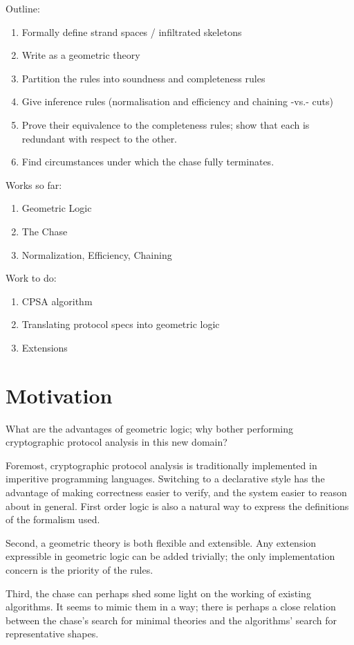\documentclass[12pt]{article}
\begin{document}
Outline:
\begin{enumerate}
\item Formally define strand spaces / infiltrated skeletons
\item Write as a geometric theory
\item Partition the rules into soundness and completeness rules
\item Give inference rules (normalisation and efficiency and chaining
  -vs.- cuts)
\item Prove their equivalence to the completeness rules; show that
  each is redundant with respect to the other.
\item Find circumstances under which the chase fully terminates.
\end{enumerate}

Works so far:
\begin{enumerate}
\item Geometric Logic
\item The Chase
\item Normalization, Efficiency, Chaining
\end{enumerate}

Work to do:
\begin{enumerate}
\item CPSA algorithm
\item Translating protocol specs into geometric logic
\item Extensions
\end{enumerate}

\section{Motivation}

What are the advantages of geometric logic; why bother performing
cryptographic protocol analysis in this new domain?

Foremost, cryptographic protocol analysis is traditionally implemented
in imperitive programming languages. Switching to a declarative style
has the advantage of making correctness easier to verify, and the
system easier to reason about in general. First order logic is also a
natural way to express the definitions of the formalism used.

Second, a geometric theory is both flexible and extensible. Any
extension expressible in geometric logic can be added trivially; the
only implementation concern is the priority of the rules.

Third, the chase can perhaps shed some light on the working of
existing algorithms. It seems to mimic them in a way; there is perhaps
a close relation between the chase's search for minimal theories and
the algorithms' search for representative shapes.
\end{document}
